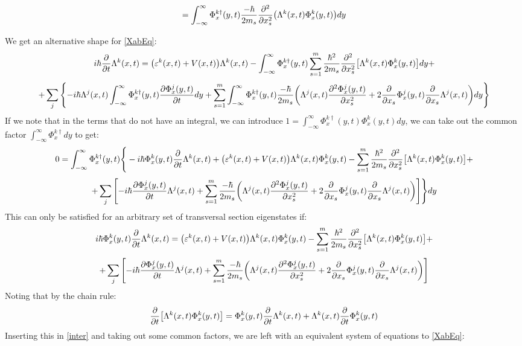 \documentclass[11pt, a4paper]{article} %
\begin{document}
$$
=\int_{-\infty}^\infty \Phi^{k\dagger}_x(y,t) \frac{-\hbar}{2m_s} \pdv[2]{}{x_s}\qty(\Lambda^k(x,t)\Phi^k_x(y,t))dy
$$

We get an alternative shape for \eqref{XabEq}:
\begin{equation}
i\hbar \pdv{}{t}\Lambda^k(x,t)=\qty( \varepsilon^k(x,t)+V(x,t) )\Lambda^k(x,t) -\int_{-\infty}^\infty \Phi^{k\dagger}_x(y,t) \sum_{s=1}^m\frac{\hbar^2}{2m_s}\pdv[2]{}{x_s}\qty[\Lambda^k(x,t)\Phi^k_x(y,t) ]dy+
\end{equation}
$$
+\sum_j\qty{-i\hbar \Lambda^j(x,t)\int_{-\infty}^\infty \Phi^{k\dagger}_x(y,t)\pdv{\Phi^j_x(y,t)}{t}dy+\sum_{s=1}^m\int_{-\infty}^\infty \Phi^{k\dagger}_x(y,t) \frac{-\hbar}{2m_s}\qty( \Lambda^j(x,t)\pdv[2]{\Phi^j_x(y,t)}{x_s}+2\pdv{}{x_s}\Phi^j_x(y,t)\pdv{}{x_s}\Lambda^j(x,t) ) dy}
$$
If we note that in the terms that do not have an integral, we can introduce $1=\int_{-\infty}^\infty \Phi^{k\dagger}_x(y,t) \Phi^k_x(y,t)dy$, we can take out the common factor $\int_{-\infty}^\infty\Phi^{k\dagger}_x dy$ to get:
\begin{equation}
0=\int_{-\infty}^\infty\Phi^{k\dagger}_x(y,t)\Bigg\{ -i\hbar \Phi^k_x(y,t)\pdv{}{t}\Lambda^k(x,t)+\qty( \varepsilon^k(x,t)+V(x,t) )\Lambda^k(x,t)\Phi^k_x(y,t) -\sum_{s=1}^m\frac{\hbar^2}{2m_s}\pdv[2]{}{x_s}\qty[\Lambda^k(x,t)\Phi^k_x(y,t) ]+
\end{equation}
$$
+\sum_j\qty[-i\hbar \pdv{\Phi^j_x(y,t)}{t}\Lambda^j(x,t)+\sum_{s=1}^m \frac{-\hbar}{2m_s}\qty( \Lambda^j(x,t)\pdv[2]{\Phi^j_x(y,t)}{x_s}+2\pdv{}{x_s}\Phi^j_x(y,t)\pdv{}{x_s}\Lambda^j(x,t) ) ]\Bigg\}dy
$$
This can only be satisfied for an arbitrary set of transversal section eigenstates if:
\begin{equation}\label{inter}
 i\hbar \Phi^k_x(y,t)\pdv{}{t}\Lambda^k(x,t)=\qty( \varepsilon^k(x,t)+V(x,t) )\Lambda^k(x,t)\Phi^k_x(y,t) -\sum_{s=1}^m\frac{\hbar^2}{2m_s}\pdv[2]{}{x_s}\qty[\Lambda^k(x,t)\Phi^k_x(y,t) ]+
\end{equation}
$$
+\sum_j\qty[-i\hbar \pdv{\Phi^j_x(y,t)}{t}\Lambda^j(x,t)+\sum_{s=1}^m \frac{-\hbar}{2m_s}\qty( \Lambda^j(x,t)\pdv[2]{\Phi^j_x(y,t)}{x_s}+2\pdv{}{x_s}\Phi^j_x(y,t)\pdv{}{x_s}\Lambda^j(x,t) ) ]
$$
Noting that by the chain rule:
\begin{equation}
\pdv{}{t}\qty[\Lambda^k(x,t)\Phi^k_x(y,t)]=\Phi^k_x(y,t)\pdv{}{t}\Lambda^k(x,t)+\Lambda^k(x,t)\pdv{}{t}\Phi^k_x(y,t)
\end{equation}
Inserting this in \eqref{inter} and taking out some common factors, we are left with an equivalent system of equations to \eqref{XabEq}:
\end{document}
